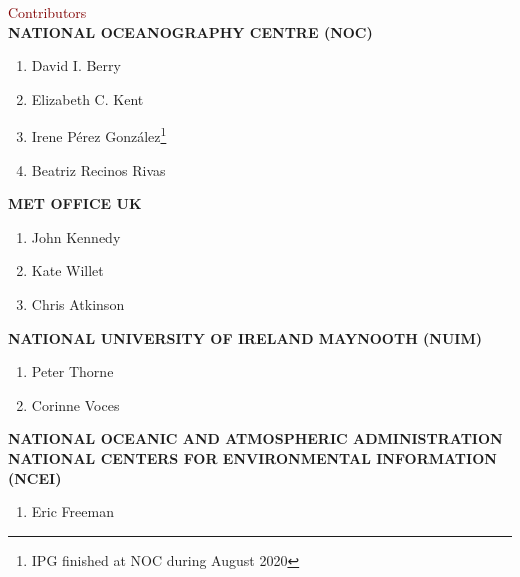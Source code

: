 \newpage

\begin{adjustwidth}{2.cm}{}
\vspace* {10mm}

{\fontsize{20}{24} \selectfont \textcolor{maroon}{Contributors}}\\

{\fontsize{14}{17} \selectfont \textbf{\uppercase{{National Oceanography Centre (NOC)}}}}
\begin{enumerate}
\item David I. Berry
\item Elizabeth C. Kent
\item Irene Pérez González\footnote{IPG finished at NOC during August 2020}
\item Beatriz Recinos Rivas
\end{enumerate}

{\fontsize{14}{17} \selectfont \textbf{\uppercase{{Met Office UK}}}}
\begin{enumerate}
\item John Kennedy
\item Kate Willet
\item Chris Atkinson
\end{enumerate}

{\fontsize{14}{17} \selectfont \textbf{\uppercase{National University of Ireland Maynooth (NUIM)}}}
\begin{enumerate}
\item Peter Thorne
\item Corinne Voces
\end{enumerate}

{\fontsize{14}{17} \selectfont \textbf{\uppercase{National Oceanic and Atmospheric Administration National Centers for Environmental Information (NCEI)}}}
\begin{enumerate}
\item Eric Freeman
\end{enumerate}

\end{adjustwidth}

